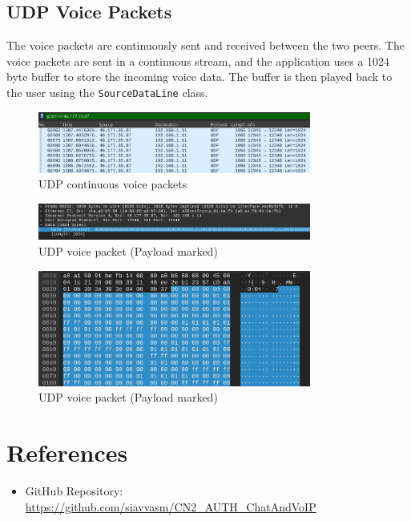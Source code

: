 \documentclass{article}
\begin{document}
\subsection{UDP Voice Packets}

The voice packets are continuously sent and received between the two peers. The voice packets are sent in a continuous stream,
and the application uses a 1024 byte buffer to store the incoming voice data. The buffer is then played back to the user using the
\texttt{SourceDataLine} class.

\begin{figure}[h]
    \centering
    \includegraphics[width=0.8\textwidth]{udp-voice-1.png}
    \caption{UDP continuous voice packets}
    \label{fig:udp-voice-1}
\end{figure}

\begin{figure}[h]
    \centering
    \includegraphics[width=0.8\textwidth]{udp-voice-2.png}
    \caption{UDP voice packet (Payload marked)}
    \label{fig:udp-voice-2}
\end{figure}

\begin{figure}[h]
    \centering
    \includegraphics[width=0.8\textwidth]{udp-voice-3.png}
    \caption{UDP voice packet (Payload marked)}
    \label{fig:udp-voice-3}
\end{figure}


\section{References}
\begin{itemize}
    \item GitHub Repository: \url{https://github.com/siavvasm/CN2_AUTH_ChatAndVoIP}
\end{itemize}
\end{document}
